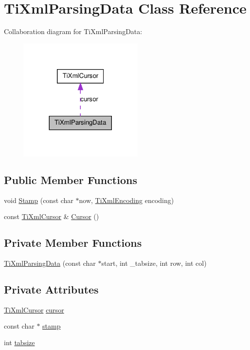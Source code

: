 \hypertarget{classTiXmlParsingData}{
\section{TiXmlParsingData Class Reference}
\label{d6/d7d/classTiXmlParsingData}
}


Collaboration diagram for TiXmlParsingData:
\nopagebreak
\begin{figure}[H]
\begin{center}
\leavevmode
\includegraphics[width=176pt]{db/db3/classTiXmlParsingData__coll__graph}
\end{center}
\end{figure}
\subsection*{Public Member Functions}
\begin{DoxyCompactItemize}
\item 
void \hyperlink{classTiXmlParsingData_a65cee8ab77a36c605db08c84b4c30a7d}{Stamp} (const char $\ast$now, \hyperlink{tinyxml_8h_a88d51847a13ee0f4b4d320d03d2c4d96}{TiXmlEncoding} encoding)
\item 
const \hyperlink{structTiXmlCursor}{TiXmlCursor} \& \hyperlink{classTiXmlParsingData_a56908a17d7d7a6b2e511e62cf1d40d05}{Cursor} ()
\end{DoxyCompactItemize}
\subsection*{Private Member Functions}
\begin{DoxyCompactItemize}
\item 
\hyperlink{classTiXmlParsingData_aa5beaf71579a91d6942277f417899ab9}{TiXmlParsingData} (const char $\ast$start, int \_\-tabsize, int row, int col)
\end{DoxyCompactItemize}
\subsection*{Private Attributes}
\begin{DoxyCompactItemize}
\item 
\hyperlink{structTiXmlCursor}{TiXmlCursor} \hyperlink{classTiXmlParsingData_abee4c6c657f595182a4f8beda4fa1c7d}{cursor}
\item 
const char $\ast$ \hyperlink{classTiXmlParsingData_a0e3c2ea5a8b738d733735ca0318fe4ff}{stamp}
\item 
int \hyperlink{classTiXmlParsingData_ab9d6aea2833e38aaef440e49c22a05ca}{tabsize}
\end{DoxyCompactItemize}
